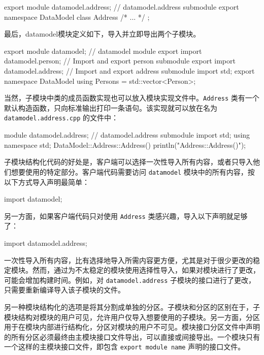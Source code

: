 \begin{cpp}
export module datamodel.address; // datamodel.address submodule
export namespace DataModel { class Address { /* ... */ }; }
\end{cpp}

最后，datamodel模块定义如下，导入并立即导出两个子模块。

\begin{cpp}
export module datamodel; // datamodel module
export import datamodel.person; // Import and export person submodule
export import datamodel.address; // Import and export address submodule
import std;
export namespace DataModel { using Persons = std::vector<Person>; }
\end{cpp}

当然，子模块中类的成员函数实现也可以放入模块实现文件中。\verb|Address| 类有一个默认构造函数，只向标准输出打印一条语句。该实现就可以放在名为 \verb|datamodel.address.cpp| 的文件中：

\begin{cpp}
module datamodel.address; // datamodel.address submodule
import std;
using namespace std;
DataModel::Address::Address() { println("Address::Address()"); }
\end{cpp}

子模块结构化代码的好处是，客户端可以选择一次性导入所有内容，或者只导入他们想要使用的特定部分。客户端代码需要访问 \verb|datamodel| 模块中的所有内容，按以下方式导入声明最简单：

\begin{cpp}
import datamodel;
\end{cpp}

另一方面，如果客户端代码只对使用 \verb|Address| 类感兴趣，导入以下声明就足够了：

\begin{cpp}
import datamodel.address;
\end{cpp}

一次性导入所有内容，比有选择地导入所需内容更方便，尤其是对于很少更改的稳定模块。然而，通过为不太稳定的模块使用选择性导入，如果对模块进行了更改，可能会增加构建时间。例如，对 \verb|datamodel.address| 子模块的接口进行了更改，只需要重新编译导入该子模块的文件。


另一种模块结构化的选项是将其分割成单独的分区。子模块和分区的区别在于，子模块结构对模块的用户可见，允许用户仅导入想要使用的子模块。另一方面，分区用于在模块内部进行结构化，分区对模块的用户不可见。模块接口分区文件中声明的所有分区必须最终由主模块接口文件导出，可以直接或间接导出。一个模块只有一个这样的主模块接口文件，即包含 \verb|export module name| 声明的接口文件。

